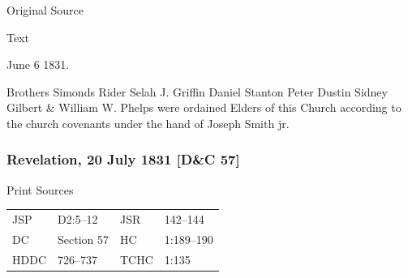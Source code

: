 			
			\begin{description}
				\item[Original Source]
			\end{description}
			
			
			\begin{description}
				\item[Text]
			\end{description}
			
				\begin{tightcenter}
					June 6 1831.
				\end{tightcenter}
			
				Brothers Simonds Rider Selah J. Griffin Daniel Stanton Peter Dustin Sidney Gilbert \& William W. Phelps were ordained Elders of this Church according to the church covenants under the hand of Joseph Smith jr.
				
		\subsubsection{Revelation, 20 July 1831 [D\&C 57]}
			\label{EMS-1831-JS-20-JUL-1831}
		
			\begin{description}
				\item[Print Sources]
			\end{description}

				\begin{tabular}{p{0.5in}p{1in}p{0.5in}p{1in}}
				JSP	 	& D2:5--12		& JSR 		& 142--144 \\
				DC	 	& Section 57 	& HC 		& 1:189--190 \\
				HDDC 	& 726--737		& TCHC 		& 1:135 \\
				\end{tabular}
			
